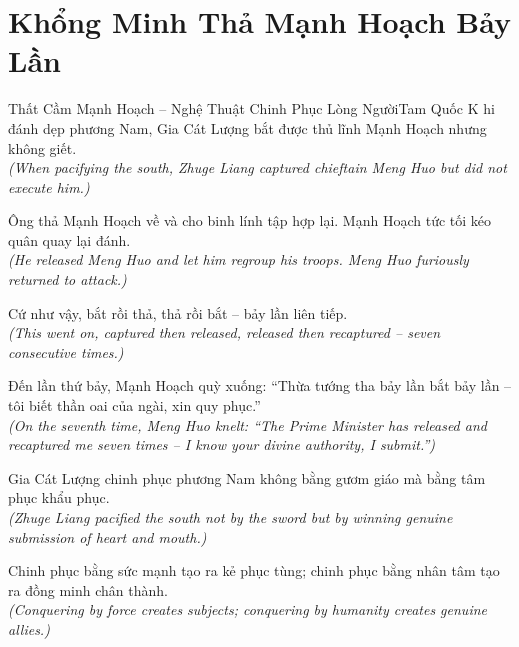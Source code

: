 \section{Khổng Minh Thả Mạnh Hoạch Bảy Lần}
\begin{truyen}{Thất Cầm Mạnh Hoạch -- Nghệ Thuật Chinh Phục Lòng Người}{Tam Quốc}
K hi đánh dẹp phương Nam, Gia Cát Lượng bắt được thủ lĩnh Mạnh Hoạch nhưng không giết.\\
\textit{(When pacifying the south, Zhuge Liang captured chieftain Meng Huo but did not execute him.)}

Ông thả Mạnh Hoạch về và cho binh lính tập hợp lại. Mạnh Hoạch tức tối kéo quân quay lại đánh.\\
\textit{(He released Meng Huo and let him regroup his troops. Meng Huo furiously returned to attack.)}

Cứ như vậy, bắt rồi thả, thả rồi bắt -- bảy lần liên tiếp.\\
\textit{(This went on, captured then released, released then recaptured -- seven consecutive times.)}

Đến lần thứ bảy, Mạnh Hoạch quỳ xuống: ``Thừa tướng tha bảy lần bắt bảy lần -- tôi biết thần oai của ngài, xin quy phục.''\\
\textit{(On the seventh time, Meng Huo knelt: ``The Prime Minister has released and recaptured me seven times -- I know your divine authority, I submit.'')}

Gia Cát Lượng chinh phục phương Nam không bằng gươm giáo mà bằng tâm phục khẩu phục.\\
\textit{(Zhuge Liang pacified the south not by the sword but by winning genuine submission of heart and mouth.)}

\end{truyen}
\begin{baihoc}
  Chinh phục bằng sức mạnh tạo ra kẻ phục tùng; chinh phục bằng nhân tâm tạo ra đồng minh chân thành.\\
  \textit{(Conquering by force creates subjects; conquering by humanity creates genuine allies.)}
\end{baihoc}

